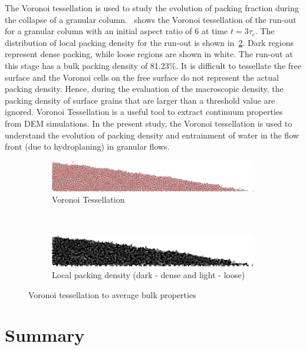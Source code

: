 The Voronoi tessellation is used to study the evolution of packing fraction 
during the collapse of a granular column.~ shows the 
Voronoi tessellation of the run-out for a granular column with an initial 
aspect ratio of 6 at time $t = 3 \tau_c$. The distribution of local packing 
density for the run-out is shown in~\cref{fig:local_density}. Dark regions 
represent dense packing, while loose regions are shown in white. The run-out at 
this stage has a bulk packing density of 81.23\%. It is difficult to tessellate 
the free surface and the Voronoi cells on the free surface do not represent the 
actual packing density. Hence, during the evaluation of the macroscopic 
density, the packing density of surface grains that are larger than a threshold 
value are ignored. Voronoi Tessellation is a useful tool to extract continuum 
properties from DEM simulations. In the present study, the Voronoi tessellation 
is used to understand the evolution of packing density and entrainment of water 
in the flow front (due to hydroplaning) in granular flows.

\begin{figure}[tbhp]
\centering
\begin{subfigure}[b]{0.95\textwidth}
\centering
\includegraphics[width=\textwidth]{tessellation}
\caption{Voronoi Tessellation}
\label{fig:tessellation}
\end{subfigure}
\\
\begin{subfigure}[b]{0.95\textwidth}
\centering
\includegraphics[width=\textwidth]{local_density}
\caption{Local packing density (dark - dense and light - loose)}
\label{fig:local_density}
\end{subfigure}
\caption{Voronoi tessellation to average bulk properties}
\label{fig:voronoi_tesselation}
\end{figure}

\section{Summary}

